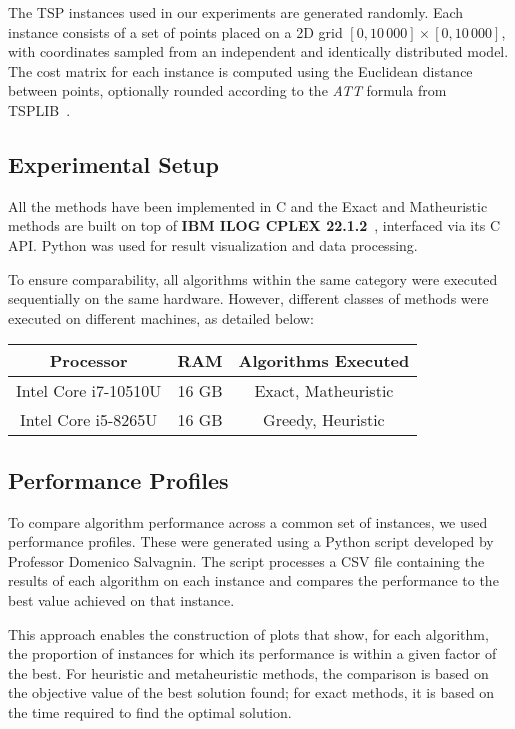 The TSP instances used in our experiments are generated randomly. Each instance consists of a set of points placed on a 2D grid $[0, 10\,000] \times [0, 10\,000]$, with coordinates sampled from an independent and identically distributed model. The cost matrix for each instance is computed using the Euclidean distance between points, optionally rounded according to the \emph{ATT} formula from TSPLIB~\cite{reinelt1995tsplib}.

\subsection{Experimental Setup}

All the methods have been implemented in C and the Exact and Matheuristic methods are built on top of \textbf{IBM ILOG CPLEX 22.1.2}~\cite{cplex2023}, interfaced via its C API. Python was used for result visualization and data processing.

To ensure comparability, all algorithms within the same category were executed sequentially on the same hardware. However, different classes of methods were executed on different machines, as detailed below:

\begin{center}
\begin{tabular}{ c | c | c }
  \textbf{Processor} & \textbf{RAM} & \textbf{Algorithms Executed} \\
  \hline
  Intel Core i7-10510U & 16 GB & Exact, Matheuristic \\
  Intel Core i5-8265U  & 16 GB & Greedy, Heuristic \\
\end{tabular}
\end{center}

\subsection{Performance Profiles}

To compare algorithm performance across a common set of instances, we used performance profiles. These were generated using a Python script developed by Professor Domenico Salvagnin. The script processes a CSV file containing the results of each algorithm on each instance and compares the performance to the best value achieved on that instance.

This approach enables the construction of plots that show, for each algorithm, the proportion of instances for which its performance is within a given factor of the best. For heuristic and metaheuristic methods, the comparison is based on the objective value of the best solution found; for exact methods, it is based on the time required to find the optimal solution.

